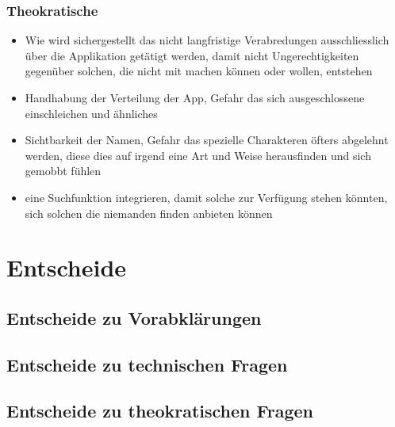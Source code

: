 \subsection{Theokratische}


\begin{itemize}
\item Wie wird sichergestellt das nicht langfristige Verabredungen ausschliesslich über die Applikation getätigt werden, damit nicht Ungerechtigkeiten gegenüber solchen, die nicht mit machen können oder wollen, entstehen
\item Handhabung der Verteilung der App, Gefahr das sich ausgeschlossene einschleichen und ähnliches
\item Sichtbarkeit der Namen, Gefahr das spezielle Charakteren öfters abgelehnt werden, diese dies auf irgend eine Art und Weise herausfinden und sich gemobbt fühlen
\item eine Suchfunktion integrieren, damit solche zur Verfügung stehen könnten, sich solchen die niemanden finden anbieten können
\end{itemize}

\chapter{Entscheide}

\section{Entscheide zu Vorabklärungen}

\section{Entscheide zu technischen Fragen}

\section{Entscheide zu theokratischen Fragen}




